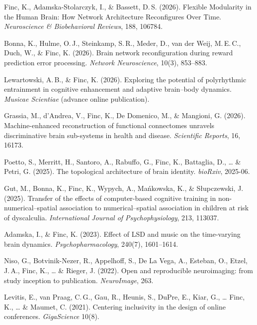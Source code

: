 \documentclass[10pt, a4paper]{article}
\newenvironment{cvlist}{%
  \begin{enumerate}[leftmargin=2em, label={[\arabic*]}, itemsep=0.25em, parsep=0pt]%
}{%
  \end{enumerate}%
}
\begin{document}
\begin{cvlist}

\item Finc, K., Adamska-Stolarczyk, I., \& Bassett, D.\,S. (2026). Flexible Modularity in the Human Brain: How Network Architecture Reconfigures Over Time. \textit{Neuroscience \& Biobehavioral Reviews}, 188, 106784.

\item Bonna, K., Hulme, O.\,J., Steinkamp, S.\,R., Meder, D., van der Weij, M.\,E.\,C., Duch, W., \& Finc, K. (2026). Brain network reconfiguration during reward prediction error processing. \textit{Network Neuroscience}, 10(3), 853--883.

\item Lewartowski, A.\,B., \& Finc, K. (2026). Exploring the potential of polyrhythmic entrainment in cognitive enhancement and adaptive brain--body dynamics. \textit{Musicae Scientiae} (advance online publication).

\item Grassia, M., d'Andrea, V., Finc, K., De Domenico, M., \& Mangioni, G. (2026). Machine-enhanced reconstruction of functional connectomes unravels discriminative brain sub-systems in health and disease. \textit{Scientific Reports}, 16, 16173.

\item Poetto, S., Merritt, H., Santoro, A., Rabuffo, G., Finc, K., Battaglia, D., \ldots{} \& Petri, G. (2025). The topological architecture of brain identity. \textit{bioRxiv}, 2025-06.

\item Gut, M., Bonna, K., Finc, K., Wypych, A., Ma\'nkowska, K., \& S{\l}upczewski, J. (2025). Transfer of the effects of computer-based cognitive training in non-numerical--spatial association to numerical--spatial association in children at risk of dyscalculia. \textit{International Journal of Psychophysiology}, 213, 113037.

\item Adamska, I., \& Finc, K. (2023). Effect of LSD and music on the time-varying brain dynamics. \textit{Psychopharmacology}, 240(7), 1601--1614.

\item Niso, G., Botvinik-Nezer, R., Appelhoff, S., De La Vega, A., Esteban, O., Etzel, J.\,A., Finc, K., \ldots{} \& Rieger, J. (2022). Open and reproducible neuroimaging: from study inception to publication. \textit{NeuroImage}, 263.

\item Levitis, E., van Praag, C.\,G., Gau, R., Heunis, S., DuPre, E., Kiar, G., \ldots{} Finc, K., \ldots{} \& Maumet, C. (2021). Centering inclusivity in the design of online conferences. \textit{GigaScience} 10(8).


\end{cvlist}
\end{document}
